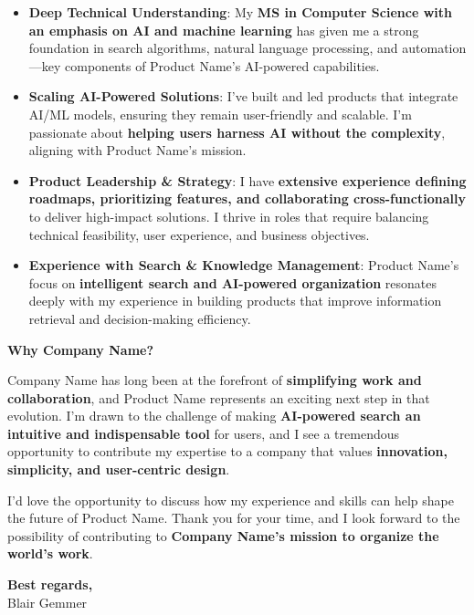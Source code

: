\documentclass[a4paper,10.5pt]{article}
\newcommand{\applicantName}{Blair Gemmer}
\newcommand{\companyName}{Company Name}
\newcommand{\productName}{Product Name}
\begin{document}
\begin{itemize}
    \item \textbf{Deep Technical Understanding}: My \textbf{MS in Computer Science with an emphasis on AI and machine learning} has given me a strong foundation in search algorithms, natural language processing, and automation—key components of \productName’s AI-powered capabilities.
    \item \textbf{Scaling AI-Powered Solutions}: I’ve built and led products that integrate AI/ML models, ensuring they remain user-friendly and scalable. I’m passionate about \textbf{helping users harness AI without the complexity}, aligning with \productName’s mission.
    \item \textbf{Product Leadership \& Strategy}: I have \textbf{extensive experience defining roadmaps, prioritizing features, and collaborating cross-functionally} to deliver high-impact solutions. I thrive in roles that require balancing technical feasibility, user experience, and business objectives.
    \item \textbf{Experience with Search \& Knowledge Management}: \productName’s focus on \textbf{intelligent search and AI-powered organization} resonates deeply with my experience in building products that improve information retrieval and decision-making efficiency.
\end{itemize}

\vspace{0.5cm}

\noindent
\textbf{Why \companyName?}

\companyName{} has long been at the forefront of \textbf{simplifying work and collaboration}, and \productName{} represents an exciting next step in that evolution. I’m drawn to the challenge of making \textbf{AI-powered search an intuitive and indispensable tool} for users, and I see a tremendous opportunity to contribute my expertise to a company that values \textbf{innovation, simplicity, and user-centric design}.

\vspace{0.5cm}

I’d love the opportunity to discuss how my experience and skills can help shape the future of \productName{}. Thank you for your time, and I look forward to the possibility of contributing to \textbf{\companyName’s mission to organize the world’s work}.

\vspace{0.5cm}

\noindent
\textbf{Best regards,} \\
\applicantName
\end{document}
